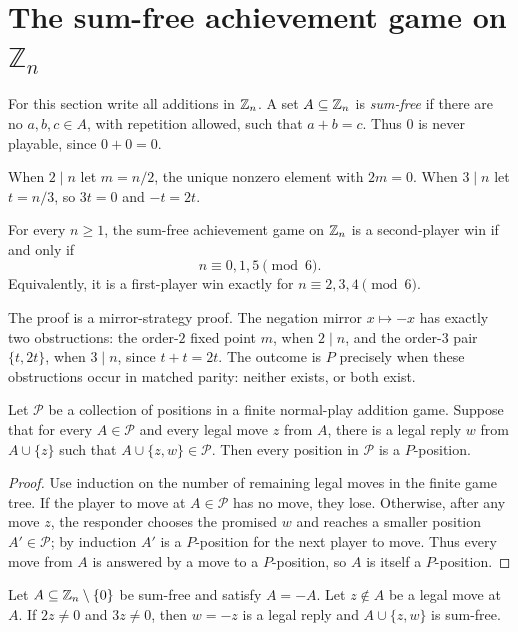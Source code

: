 \section{The sum-free achievement game on \texorpdfstring{$\mathbb{Z}_n$}{Zn}}
\label{sec:sumfree-zn}

For this section write all additions in $\mathbb{Z}_{n}$. A set $A\subseteq \mathbb{Z}_{n}$ is
\emph{sum-free} if there are no $a,b,c\in A$, with repetition allowed, such that
$a+b=c$. Thus $0$ is never playable, since $0+0=0$.

When $2\mid n$ let $m=n/2$, the unique nonzero element with $2m=0$. When $3\mid n$ let
$t=n/3$, so $3t=0$ and $-t=2t$.

\begin{theorem}
\label{thm:sumfree-zn}
For every $n\geq 1$, the sum-free achievement game on $\mathbb{Z}_{n}$ is a second-player win
if and only if
\[
  n \equiv 0,1,5 \pmod 6.
\]
Equivalently, it is a first-player win exactly for $n\equiv 2,3,4\pmod 6$.
\end{theorem}

The proof is a mirror-strategy proof. The negation mirror $x\mapsto -x$ has exactly two
obstructions: the order-$2$ fixed point $m$, when $2\mid n$, and the order-$3$ pair
$\{t,2t\}$, when $3\mid n$, since $t+t=2t$. The outcome is $P$ precisely when these
obstructions occur in matched parity: neither exists, or both exist.

\begin{lemma}
\label{lem:sumfree-responder}
Let $\mathcal P$ be a collection of positions in a finite normal-play addition game. Suppose
that for every $A\in\mathcal P$ and every legal move $z$ from $A$, there is a legal reply
$w$ from $A\cup\{z\}$ such that $A\cup\{z,w\}\in\mathcal P$. Then every position in
$\mathcal P$ is a $P$-position.
\end{lemma}

\begin{proof}
Use induction on the number of remaining legal moves in the finite game tree. If the player
to move at $A\in\mathcal P$ has no move, they lose. Otherwise, after any move $z$, the
responder chooses the promised $w$ and reaches a smaller position $A'\in\mathcal P$; by
induction $A'$ is a $P$-position for the next player to move. Thus every move from $A$ is
answered by a move to a $P$-position, so $A$ is itself a $P$-position.
\end{proof}

\begin{lemma}
\label{lem:sumfree-negation}
Let $A\subseteq \mathbb{Z}_{n}\setminus\{0\}$ be sum-free and satisfy $A=-A$. Let $z\notin A$ be
a legal move at $A$. If $2z\neq 0$ and $3z\neq 0$, then $w=-z$ is a legal reply and
$A\cup\{z,w\}$ is sum-free.
\end{lemma}

